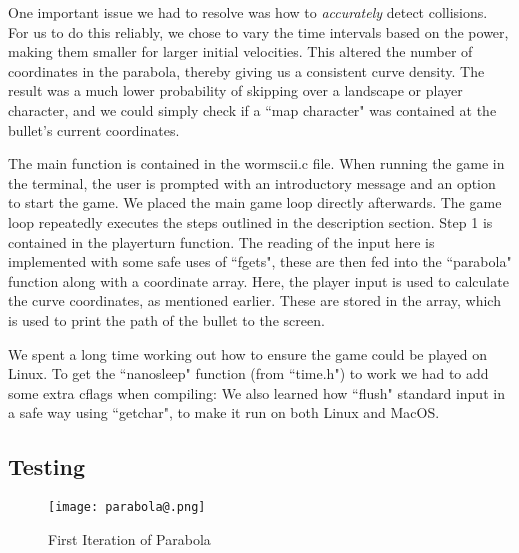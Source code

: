 \documentclass[]{article}
\begin{document}
\vspace{5mm}

One important issue we had to resolve was how to \textit{accurately} detect collisions. For us to do this reliably, we chose to vary the time intervals based on the power, making them smaller for larger initial velocities. This altered the number of coordinates in the parabola, thereby giving us a consistent curve density. The result was a much lower probability of skipping over a landscape or player character, and we could simply check if a ``map character" was contained at the bullet's current coordinates.

\vspace{3mm}

The main function is contained in the wormscii.c file. When running the game in the terminal, the user is prompted with an introductory message and an option to start the game. We placed the main game loop directly afterwards. The game loop repeatedly executes the steps outlined in the description section. Step 1 is contained in the player\textunderscore turn function. The reading of the input here is implemented with some safe uses of ``fgets", these are then fed into the ``parabola" function along with a coordinate array. Here, the player input is used to calculate the curve coordinates, as mentioned earlier. These are stored in the array, which is used to print the path of the bullet to the screen.

\vspace{3mm}

\noindent We spent a long time working out how to ensure the game could be played on Linux. To get the ``nanosleep" function (from ``time.h") to work we had to add some extra cflags when compiling: \newline{} \noindent We also learned how ``flush" standard input in a safe way using ``getchar", to make it run on both Linux and MacOS.

\newpage
\subsection*{Testing}

\vspace{3mm}
\begin{wrapfigure}[14]{R}{0.45\textwidth}
\centering
    \centering
\vspace{-3mm}
\texttt{[image: parabola@.png]}
\vspace{1mm}
  \caption{\label{fig2 :}First Iteration of Parabola}
\end{wrapfigure}
\end{document}
